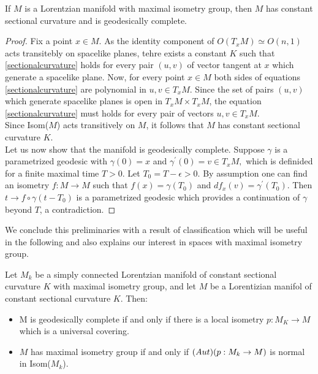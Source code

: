 \begin{lemma}\label{maximalisometry}
    If $M$ is a Lorentzian manifold with maximal isometry group, then $M$ has constant sectional curvature and is geodesically complete.
\end{lemma}

\begin{proof}
    Fix a point $x\in M$. As the identity component of $O(T_x M)\simeq O(n,1)$ acts transitebly on spacelike planes, tehre exists a constant $K$ such that \ref{sectionalcurvature} holds for every pair $(u,v)$ of vector tangent at $x$ which generate a spacelike plane. Now, for every point $x\in M$ both sides of equations \ref{sectionalcurvature} are polynomial in $u,v \in T_xM$. Since the set of pairs $(u,v)$ which generate spacelike planes is open in $T_{x}M\times T_{x}M$, the equation \ref{sectionalcurvature} must holds for every pair of vectors $u,v \in T_xM$.\\ Since Isom($M$) acts transitively on $M$, it follows that $M$ has constant sectional curvature $K$.\\
    Let us now show that the manifold is geodesically complete. Suppose $\gamma$ is a parametrized geodesic with $\gamma(0)=x$ and $\gamma^{\prime} (0)=v\in T_xM,$ which is definided for a finite maximal time $T>0.$ Let $T_0=T-\epsilon>0.$ By assumption one can find an isometry $f:M\to M$ such that $f(x)=\gamma(T_0)$ and $df_x(v)=\gamma^{\prime}(T_0).$ Then $t\to f\circ\gamma(t-T_0)$ is a parametrized geodesic which provides a continuation of $\gamma$ beyond $T$, a contradiction. 
\end{proof}

We conclude this preliminaries with a result of classification which will be useful in the following and also explains our interest in spaces with maximal isometry group.
\begin{proposition}\label{classification}
    Let $M_k$ be a simply connected Lorentzian manifold of constant sectional curvature $K$ with maximal isometry group, and let $M$ be a Lorentizian manifol of constant sectional curvature $K$. Then: 
    \begin{itemize}
        \item M is geodesically complete if and only if there is a local isometry $p:M_K\to M$ which is a universal covering.
        \item $M$ has maximal isometry group if and only if $\text(Aut)(p:M_k\to M)$ is normal in Isom($M_k$). 
    \end{itemize}
\end{proposition}

